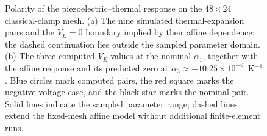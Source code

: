 \begin{figure}[t]
\begin{minipage}[t]{0.49\linewidth}
\end{minipage}
\caption{Polarity of the piezoelectric--thermal response on the $48\times24$
 classical-clamp mesh. (a) The nine simulated thermal-expansion pairs and
 the $V_E=0$ boundary implied by their affine dependence; the dashed
 continuation lies outside the sampled parameter domain. (b) The three
 computed $V_E$ values at the nominal $\alpha_1$, together with the affine
 response and its predicted zero at $\alpha_3\approx-10.25\times10^{-6}$~K$^{-1}$.
 Blue circles mark computed pairs, the red square marks the negative-voltage
 case, and the black star marks the nominal pair. Solid lines indicate
 the sampled parameter range; dashed lines extend the fixed-mesh affine model
 without additional finite-element runs.}
\label{fig:alpha-polarity}
\end{figure}
